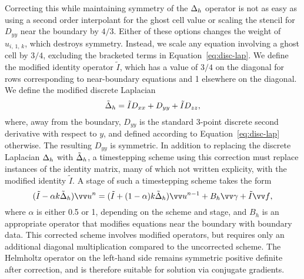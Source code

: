 Correcting this while maintaining symmetry of the $\Delta_h$ operator is not as easy
as using a second order interpolant for the ghost cell value or scaling the stencil for
$D_{yy}$ near the boundary by $4/3$. Either of these options changes the weight of
$u_{i,\,1,\,k}$, which destroys symmetry. Instead, we scale any equation involving a
ghost cell by $3/4$, excluding the bracketed terms in Equation~\eqref{eq:disc-lap}. We
define the modified identity operator $\tilde{I}$, which has a value of $3/4$ on the
diagonal for rows corresponding to near-boundary equations and 1 elsewhere on the
diagonal. We define the modified discrete Laplacian
\begin{equation}\label{eq:mod-disc-lap}
    \tilde{\Delta}_h = \tilde{I}D_{xx} + D_{yy} + \tilde{I}D_{zz},
\end{equation}
where, away from the boundary, $D_{yy}$ is the standard 3-point discrete second
derivative with respect to $y$, and defined according to Equation~\eqref{eq:disc-lap}
otherwise. The resulting $D_{yy}$ is symmetric. In addition to replacing the discrete
Laplacian $\Delta_h$ with $\tilde{\Delta}_h$, a timestepping scheme using this
correction must replace instances of the identity matrix, many of which not written
explicity, with the modified identity $\tilde{I}$. A stage of such a timestepping scheme
takes the form
\begin{equation*}
    (\tilde{I} - \alpha k\tilde{\laplacian}_h)\arr{u}^n = (\tilde{I} + (1-\alpha)k\tilde{\laplacian}_h)\arr{u}^{n-1} + B_h\arr{\gamma} + \tilde{I}\arr{f},
\end{equation*}
where $\alpha$ is either 0.5 or 1, depending on the scheme and stage, and $B_h$ is an
appropriate operator that modifies equations near the boundary with boundary data. This
corrected scheme involves modified operators, but requires only an additional diagonal
multiplication compared to the uncorrected scheme. The Helmholtz operator on the
left-hand side remains symmetric positive definite after correction, and is therefore
suitable for solution via conjugate gradients.


